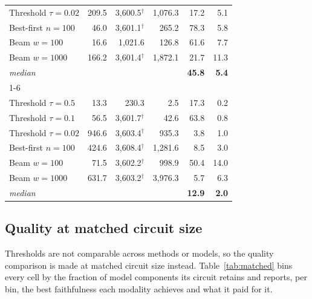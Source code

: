 \documentclass[11pt,a4paper]{article}
\begin{document}
\begin{table}[h]
\begin{tabular}{lrrrrr}
\quad Threshold $\tau{=}0.02$ & 209.5 & 3,600.5$^{\dagger}$ & 1,076.3 & 17.2 & 5.1 \\
\quad Best-first $n{=}100$ & 46.0 & 3,601.1$^{\dagger}$ & 265.2 & 78.3 & 5.8 \\
\quad Beam $w{=}100$ & 16.6 & 1,021.6 & 126.8 & 61.6 & 7.7 \\
\quad Beam $w{=}1000$ & 166.2 & 3,601.4$^{\dagger}$ & 1,872.1 & 21.7 & 11.3 \\
\quad \textit{median} & & & & \textbf{45.8} & \textbf{5.4} \\
\cmidrule(l){1-6}
\multicolumn{6}{l}{\quad\itshape positional} \\
\quad Threshold $\tau{=}0.5$ & 13.3 & 230.3 & 2.5 & 17.3 & 0.2 \\
\quad Threshold $\tau{=}0.1$ & 56.5 & 3,601.7$^{\dagger}$ & 42.6 & 63.8 & 0.8 \\
\quad Threshold $\tau{=}0.02$ & 946.6 & 3,603.4$^{\dagger}$ & 935.3 & 3.8 & 1.0 \\
\quad Best-first $n{=}100$ & 424.6 & 3,608.4$^{\dagger}$ & 1,281.6 & 8.5 & 3.0 \\
\quad Beam $w{=}100$ & 71.5 & 3,602.2$^{\dagger}$ & 998.9 & 50.4 & 14.0 \\
\quad Beam $w{=}1000$ & 631.7 & 3,603.2$^{\dagger}$ & 3,976.3 & 5.7 & 6.3 \\
\quad \textit{median} & & & & \textbf{12.9} & \textbf{2.0} \\
\bottomrule
\end{tabular}
\end{table}

\subsection{Quality at matched circuit size}

Thresholds are not comparable across methods or models, so the quality comparison is made at
matched circuit size instead. Table~\ref{tab:matched} bins every cell by the fraction of model
components its circuit retains and reports, per bin, the best faithfulness each modality
achieves and what it paid for it.
\end{document}
